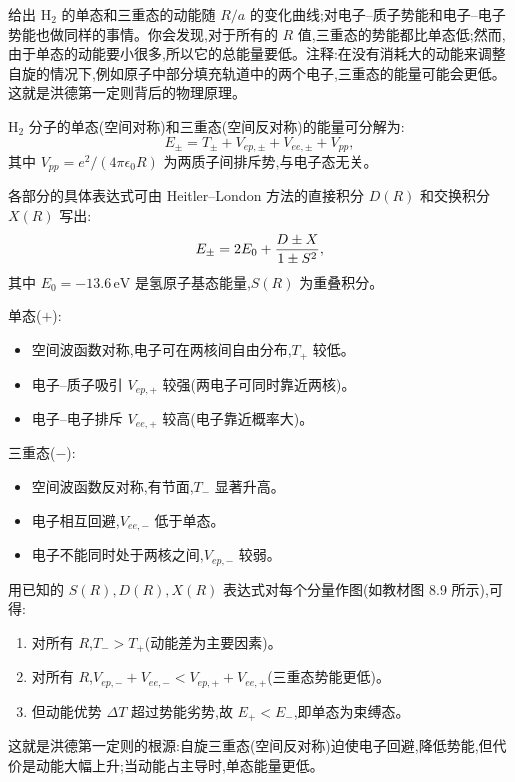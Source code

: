 \begin{question}
给出 $\mathrm{H}_2$ 的单态和三重态的动能随 $R/a$ 的变化曲线;对电子--质子势能和电子--电子势能也做同样的事情。你会发现,对于所有的 $R$ 值,三重态的势能都比单态低;然而,由于单态的动能要小很多,所以它的总能量要低。注释:在没有消耗大的动能来调整自旋的情况下,例如原子中部分填充轨道中的两个电子,三重态的能量可能会更低。这就是洪德第一定则背后的物理原理。
\begin{solution}
$\mathrm H_2$ 分子的单态(空间对称)和三重态(空间反对称)的能量可分解为:
\[
E_\pm=T_\pm+V_{ep,\pm}+V_{ee,\pm}+V_{pp},
\]
其中 $V_{pp}=e^2/(4\pi\epsilon_0R)$ 为两质子间排斥势,与电子态无关。

各部分的具体表达式可由 Heitler--London 方法的直接积分 $D(R)$ 和交换积分 $X(R)$ 写出:
\[
E_\pm=2E_0+{D\pm X\over1\pm S^2},
\]
其中 $E_0=-13.6\,\mathrm{eV}$ 是氢原子基态能量,$S(R)$ 为重叠积分。

单态($+$):
\begin{itemize}
\item 空间波函数对称,电子可在两核间自由分布,$T_+$ 较低。
\item 电子--质子吸引 $V_{ep,+}$ 较强(两电子可同时靠近两核)。
\item 电子--电子排斥 $V_{ee,+}$ 较高(电子靠近概率大)。
\end{itemize}
三重态($-$):
\begin{itemize}
\item 空间波函数反对称,有节面,$T_-$ 显著升高。
\item 电子相互回避,$V_{ee,-}$ 低于单态。
\item 电子不能同时处于两核之间,$V_{ep,-}$ 较弱。
\end{itemize}

用已知的 $S(R),D(R),X(R)$ 表达式对每个分量作图(如教材图 8.9 所示),可得:
\begin{enumerate}
\item 对所有 $R$,$T_- > T_+$(动能差为主要因素)。
\item 对所有 $R$,$V_{ep,-}+V_{ee,-} < V_{ep,+}+V_{ee,+}$(三重态势能更低)。
\item 但动能优势 $\Delta T$ 超过势能劣势,故 $E_+ < E_-$,即单态为束缚态。
\end{enumerate}
这就是洪德第一定则的根源:自旋三重态(空间反对称)迫使电子回避,降低势能,但代价是动能大幅上升;当动能占主导时,单态能量更低。
\end{solution}
\end{question}

